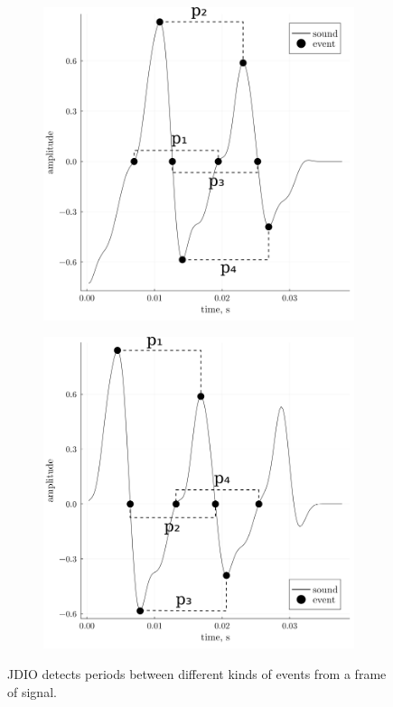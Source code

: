 \documentclass[a4paper]{article}
\begin{document}
\begin{figure}
    \begin{subfigure}[b]{0.5\textwidth}
        \centering
        \includegraphics{graphics/pd1.png}
        \caption{}
        \label{fig:period_detection_1}
    \end{subfigure}
    \begin{subfigure}[b]{0.5\textwidth}
        \centering
        \includegraphics{graphics/pd2.png}
        \caption{}
        \label{fig:period_detection_2}
    \end{subfigure}
    \caption{JDIO detects periods between different kinds of events from a frame of signal.}
    \label{fig:period_detection}
\end{figure}
\end{document}
